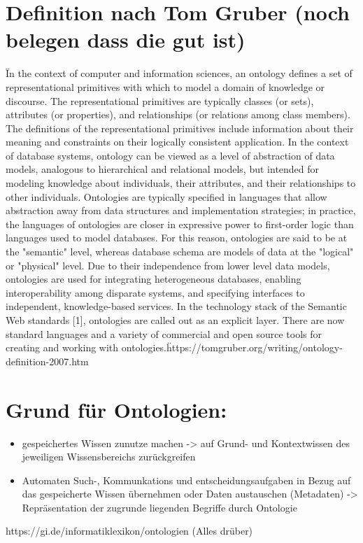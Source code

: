 \section*{Definition nach Tom Gruber (noch belegen dass die gut ist)}	
	\"In the context of computer and information sciences, an ontology defines a set of representational primitives with which to model a domain of knowledge or discourse.  The representational primitives are typically classes (or sets), attributes (or properties), and relationships (or relations among class members).  The definitions of the representational primitives include information about their meaning and constraints on their logically consistent application.  In the context of database systems, ontology can be viewed as a level of abstraction of data models, analogous to hierarchical and relational models, but intended for modeling knowledge about individuals, their attributes, and their relationships to other individuals.  Ontologies are typically specified in languages that allow abstraction away from data structures and implementation strategies; in practice, the languages of ontologies are closer in expressive power to first-order logic than languages used to model databases.  For this reason, ontologies are said to be at the "semantic" level, whereas database schema are models of data at the "logical" or "physical" level.  Due to their independence from lower level data models, ontologies are used for integrating heterogeneous databases, enabling interoperability among disparate systems, and specifying interfaces to independent, knowledge-based services.  In the technology stack of the Semantic Web standards [1], ontologies are called out as an explicit layer.  There are now standard languages and a variety of commercial and open source tools for creating and working with ontologies.\"
	https://tomgruber.org/writing/ontology-definition-2007.htm
		
\section*{Grund für Ontologien: }
\begin{itemize}
	\item gespeichertes Wissen zunutze machen -> auf Grund- und Kontextwissen des jeweiligen Wissensbereichs zurückgreifen
	\item Automaten Such-, Kommunkations und entscheidungsaufgaben in Bezug auf das gespeicherte Wissen übernehmen oder Daten austauschen (Metadaten) -> Repräsentation der zugrunde liegenden Begriffe durch Ontologie
\end{itemize}
	https://gi.de/informatiklexikon/ontologien (Alles drüber)

